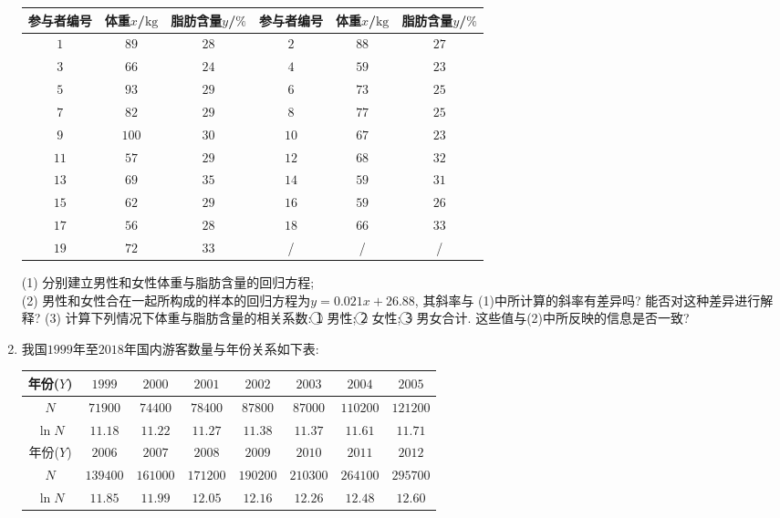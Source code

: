 \documentclass[10pt,a4paper]{article}
\begin{document}
\begin{enumerate}[1.]
\begin{center}
\begin{tabular}{|c|c|c|c|c|c|}
\hline
参与者编号 & 体重$x$/$\text{kg}$ & 脂肪含量$y$/$\%$ & 参与者编号 & 体重$x$/$\text{kg}$ & 脂肪含量$y$/$\%$ \\ \hline
$1$ & $89$ & $28$ & $2$ & $88$ & $27$ \\ \hline
$3$ & $66$ & $24$ & $4$ & $59$ & $23$ \\ \hline
$5$ & $93$ & $29$ & $6$ & $73$ & $25$ \\ \hline
$7$ & $82$ & $29$ & $8$ & $77$ & $25$ \\ \hline
$9$ & $100$ & $30$ & $10$ & $67$ & $23$ \\ \hline
$11$ & $57$ & $29$ & $12$ & $68$ & $32$ \\ \hline
$13$ & $69$ & $35$ & $14$ & $59$ & $31$ \\ \hline
$15$ & $62$ & $29$ & $16$ & $59$ & $26$ \\ \hline
$17$ & $56$ & $28$ & $18$ & $66$ & $33$ \\ \hline
$19$ & $72$ & $33$ & / & / & / \\ \hline
\end{tabular}
\end{center}
(1) 分别建立男性和女性体重与脂肪含量的回归方程;\\
(2) 男性和女性合在一起所构成的样本的回归方程为$y=0.021x+26.88$, 其斜率与
(1)中所计算的斜率有差异吗? 能否对这种差异进行解释?
(3) 计算下列情况下体重与脂肪含量的相关系数: \textcircled{1} 男性; \textcircled{2} 女性; \textcircled{3} 男女合计. 这些值与(2)中所反映的信息是否一致?
\item 我国$1999$年至$2018$年国内游客数量与年份关系如下表:
\begin{center}
\begin{tabular}{|c|c|c|c|c|c|c|c|}
\hline
年份($Y$) & $1999$ & $2000$ & $2001$ & $2002$ & $2003$ & $2004$ & $2005$ \\ \hline
$N$ & $71900$ & $74400$ & $78400$ & $87800$ & $87000$ & $110200$ & $121200$ \\ \hline
$\ln N$ & $11.18$ & $11.22$ & $11.27$ & $11.38$ & $11.37$ & $11.61$ & $11.71$ \\ \hline
年份($Y$) & $2006$ & $2007$ & $2008$ & $2009$ & $2010$ & $2011$ & $2012$ \\ \hline
$N$ & $139400$ & $161000$ & $171200$ & $190200$ & $210300$ & $264100$ & $295700$ \\ \hline
$\ln N$ & $11.85$ & $11.99$ & $12.05$ & $12.16$ & $12.26$ & $12.48$ & $12.60$ \\ \hline

\end{tabular}
\end{center}
\end{enumerate}
\end{document}
